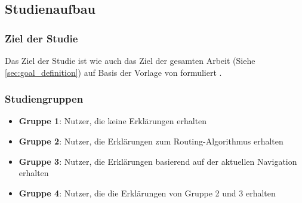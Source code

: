 \subsection{Studienaufbau}

\subsubsection{Ziel der Studie}

Das Ziel der Studie ist wie auch das Ziel der gesamten Arbeit (Siehe \autoref{sec:goal_definition}) auf Basis der Vorlage von \citeauthor{wohlin2012experimentation} formuliert \cite{wohlin2012experimentation}.

\noindent{}

\subsubsection*{Studiengruppen}

\begin{itemize}
    \item \textbf{Gruppe 1}: Nutzer, die keine Erklärungen erhalten
    \item \textbf{Gruppe 2}: Nutzer, die Erklärungen zum Routing-Algorithmus erhalten
    \item \textbf{Gruppe 3}: Nutzer, die Erklärungen basierend auf der aktuellen Navigation erhalten
    \item \textbf{Gruppe 4}: Nutzer, die die Erklärungen von Gruppe 2 und 3 erhalten
\end{itemize}